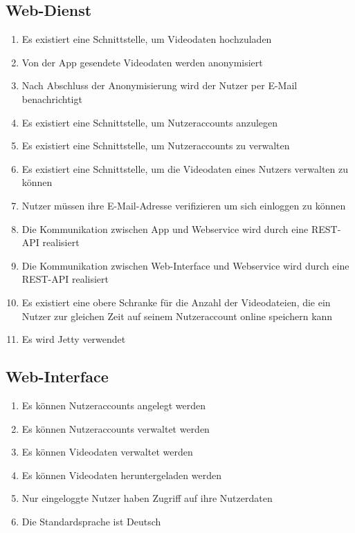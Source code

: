 \subsection{Web-Dienst}
	\begin{enumerate}
	\renewcommand{\labelenumi}{\textbf{\theenumi}}
	\renewcommand{\theenumi}{PK\arabic{enumi}0}
	\setcounter{enumi}{199}
	\item Es existiert eine Schnittstelle, um Videodaten hochzuladen
	\item Von der App gesendete Videodaten werden anonymisiert
	\item Nach Abschluss der Anonymisierung wird der Nutzer per E-Mail benachrichtigt
	\item Es existiert eine Schnittstelle, um Nutzeraccounts anzulegen
	\item Es existiert eine Schnittstelle, um Nutzeraccounts zu verwalten
	\item Es existiert eine Schnittstelle, um die Videodaten eines Nutzers verwalten zu können
	\item Nutzer müssen ihre E-Mail-Adresse verifizieren um sich einloggen zu können
	\item Die Kommunikation zwischen App und Webservice wird durch eine REST-API realisiert
	\item Die Kommunikation zwischen Web-Interface und Webservice wird durch eine REST-API realisiert
	\item Es existiert eine obere Schranke für die Anzahl der Videodateien, die ein Nutzer zur gleichen Zeit auf seinem Nutzeraccount online speichern kann
	\item Es wird Jetty verwendet
	\end{enumerate}
\subsection{Web-Interface}
	\begin{enumerate}
	\renewcommand{\labelenumi}{\textbf{\theenumi}}
	\renewcommand{\theenumi}{PK\arabic{enumi}0}
	\setcounter{enumi}{299}
	\item Es können Nutzeraccounts angelegt werden
	\item Es können Nutzeraccounts verwaltet werden
	\item Es können Videodaten verwaltet werden
	\item Es können Videodaten heruntergeladen werden
	\item Nur eingeloggte Nutzer haben Zugriff auf ihre Nutzerdaten
	\item Die Standardsprache ist Deutsch
	\end{enumerate}


